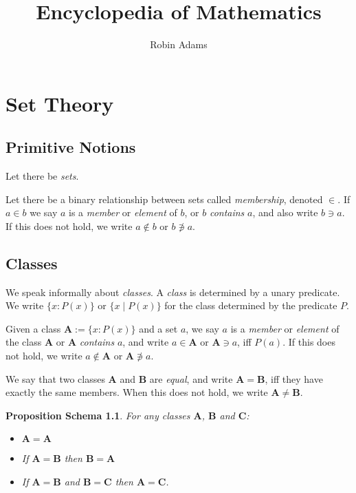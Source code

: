 \documentclass{book}
\title{Encyclopedia of Mathematics}
\author{Robin Adams}
\newcommand{\mbA}{\ensuremath{\mathbf{A}}}
\newcommand{\mbB}{\ensuremath{\mathbf{B}}}
\newcommand{\mbC}{\ensuremath{\mathbf{C}}}
\newtheorem{props}{Proposition Schema}
\begin{document}
    \maketitle
    \tableofcontents

    \chapter{Set Theory}

    \section{Primitive Notions}

    Let there be \emph{sets}.

    Let there be a binary relationship between sets called \emph{membership}, denoted $\in$. If $a \in b$ we say $a$ is a \emph{member} or \emph{element} of $b$, or $b$ \emph{contains} $a$, and also write $b \ni a$. If this does not hold, we write $a \notin b$ or $b \not\ni a$.

    \section{Classes}

    We speak informally about \emph{classes}. A \emph{class} is determined by a unary predicate. We write $\{ x : P(x) \}$ or $\{ x \mid P(x) \}$ for the class determined by the predicate $P$.

    Given a class $\mbA := \{ x : P(x) \}$ and a set $a$, we say $a$ is a \emph{member} or \emph{element} of the class $\mbA$ or $\mbA$ \emph{contains} $a$, and write $a \in \mbA$ or $\mbA \ni a$, iff $P(a)$. If this does not hold, we write $a \notin \mbA$ or $\mbA \not\ni a$.

    We say that two classes $\mbA$ and $\mathbf{B}$ are \emph{equal}, and write $\mbA = \mbB$, iff they have exactly the same members. When this does not hold, we write $\mbA \neq \mbB$.

    \begin{props}
        For any classes $\mbA$, $\mbB$ and $\mbC$:
        \begin{itemize}
            \item $\mbA = \mbA$
            \item If $\mbA = \mbB$ then $\mbB = \mbA$
            \item If $\mbA = \mbB$ and $\mbB = \mbC$ then $\mbA = \mbC$.
        \end{itemize}
    \end{props}
\end{document}

